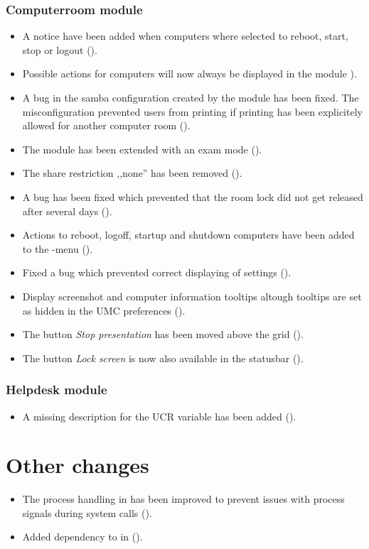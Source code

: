 \subsubsection{Computerroom module}
\begin{itemize}
\item A notice have been added when computers where selected to reboot, start, stop or logout ().
\item Possible actions for computers will now always be displayed in the  module ).
\item A bug in the samba configuration created by the  module has been fixed. The
  misconfiguration prevented users from printing if printing has been explicitely allowed for another computer
  room ().
\item The  module has been extended with an exam mode ().
\item The share restriction ,,none'' has been removed ().
\item A bug has been fixed which prevented that the room lock did not get released after several days ().
\item Actions to reboot, logoff, startup and shutdown computers have been added to the -menu ().
\item Fixed a bug which prevented correct displaying of  settings ().
\item Display screenshot and computer information tooltips altough tooltips are set as hidden in the UMC preferences ().
\item The button \emph{Stop presentation} has been moved above the grid ().
\item The button \emph{Lock screen} is now also available in the statusbar ().
\end{itemize}

\subsubsection{Helpdesk module}
\begin{itemize}
\item A missing description for the UCR variable  has been added ().
\end{itemize}


\section{Other changes}
\begin{itemize}
\item The process handling in  has been improved to prevent issues with process
  signals during system calls ().
\item Added dependency to  in  ().
\end{itemize}

